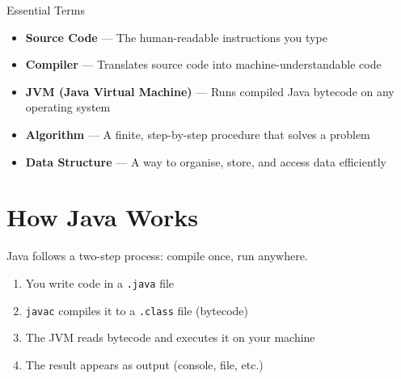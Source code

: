 \documentclass[12pt,a4paper,oneside]{book}
\begin{document}
\begin{definitionbox}{Essential Terms}
\begin{itemize}
  \item \textbf{Source Code} --- The human-readable instructions you type
  \item \textbf{Compiler} --- Translates source code into machine-understandable code
  \item \textbf{JVM (Java Virtual Machine)} --- Runs compiled Java bytecode on any operating system
  \item \textbf{Algorithm} --- A finite, step-by-step procedure that solves a problem
  \item \textbf{Data Structure} --- A way to organise, store, and access data efficiently
\end{itemize}
\end{definitionbox}

\section{How Java Works}

Java follows a two-step process: compile once, run anywhere.

\begin{center}
\end{center}

\begin{enumerate}
  \item You write code in a \texttt{.java} file
  \item \texttt{javac} compiles it to a \texttt{.class} file (bytecode)
  \item The JVM reads bytecode and executes it on your machine
  \item The result appears as output (console, file, etc.)
\end{enumerate}
\end{document}
